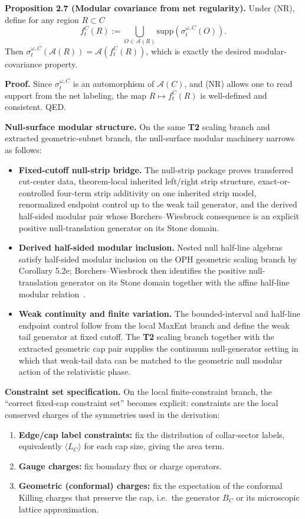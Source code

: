 \textbf{Proposition 2.7 (Modular covariance from net regularity).} Under (NR), define for any region \(R\subset C\)
\[
f_t^C(R)
:=
\bigcup_{O\in \mathcal A(R)}
\mathrm{supp}\!\left(\sigma_t^{\omega,C}(O)\right).
\]
Then \(\sigma_t^{\omega,C}(\mathcal A(R))=\mathcal A(f_t^C(R))\), which is exactly the desired modular-covariance property.

\textbf{Proof.} Since \(\sigma_t^{\omega,C}\) is an automorphism of \(\mathcal A(C)\), and (NR) allows one to read support from the net labeling, the map \(R\mapsto f_t^C(R)\) is well-defined and consistent. QED.

\textbf{Null-surface modular structure.} On the same \textbf{T2} scaling branch and extracted geometric-subnet branch, the null-surface modular machinery narrows as follows:
\begin{itemize}
\item
\textbf{Fixed-cutoff null-strip bridge.} The null-strip package proves transferred cut-center data, theorem-local inherited left/right strip structure, exact-or-controlled four-term strip additivity on one inherited strip model, renormalized endpoint control up to the weak tail generator, and the derived half-sided modular pair whose Borchers--Wiesbrock consequence is an explicit positive null-translation generator on its Stone domain.
\item
\textbf{Derived half-sided modular inclusion.} Nested null half-line algebras satisfy half-sided modular inclusion on the OPH geometric scaling branch by Corollary 5.2e; Borchers--Wiesbrock then identifies the positive null-translation generator on its Stone domain together with the affine half-line modular relation~\cite{wiesbrock93}.
\item
\textbf{Weak continuity and finite variation.} The bounded-interval and half-line endpoint control follow from the local MaxEnt branch and define the weak tail generator at fixed cutoff. The \textbf{T2} scaling branch together with the extracted geometric cap pair supplies the continuum null-generator setting in which that weak-tail data can be matched to the geometric null modular action of the relativistic phase.
\end{itemize}

\textbf{Constraint set specification.} On the local finite-constraint branch, the ``correct fixed-cap constraint set'' becomes explicit: constraints are the local conserved charges of the symmetries used in the derivation:
\begin{enumerate}
\def\labelenumi{\arabic{enumi}.}
\item
\textbf{Edge/cap label constraints:} fix the distribution of collar-sector labels, equivalently \(\langle L_C\rangle\) for each cap size, giving the area term.
\item
\textbf{Gauge charges:} fix boundary flux or charge operators.
\item
\textbf{Geometric (conformal) charges:} fix the expectation of the conformal Killing charges that preserve the cap, i.e.\ the generator \(B_C\) or its microscopic lattice approximation.
\end{enumerate}

